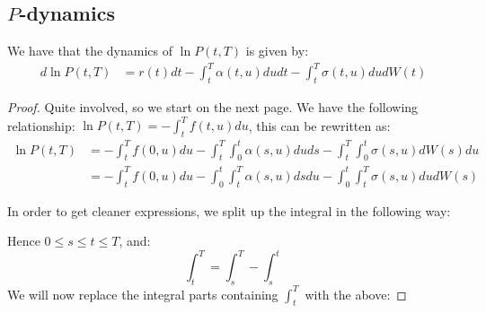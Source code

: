 \subsection{$P$-dynamics}

\begin{proposition}
We have that the dynamics of $\ln P(t,T)$ is given by: 
\begin{align*}
d\ln P(t,T) &= 
r(t)dt - \int_{t}^{T}\alpha(t,u)dudt - \int_{t}^{T}\sigma(t,u)dudW(t)    
\end{align*}
\end{proposition}

\begin{proof}

Quite involved, so we start on the next page. 
\newpage 
We have the following relationship: $\ln P(t,T) = -\int_{t}^{T}f(t,u)du$, this can be rewritten as:
\begin{align*}
\ln P(t,T) &= 
-\int_{t}^{T}f(0,u)du - \int_{t}^{T}\int_{0}^{t}\alpha(s,u)duds 
-\int_{t}^{T}\int_{0}^{t}\sigma(s,u)dW(s)du \\ 
&= 
-\int_{t}^{T}f(0,u)du - \int_{0}^{t}\int_{t}^{T}\alpha(s,u)dsdu 
-\int_{0}^{t}\int_{t}^{T}\sigma(s,u)dudW(s) 
\end{align*}

In order to get cleaner expressions, we split up the integral in the following way:



Hence $0 \leq s \leq t \leq T$, and: 
$$
\int_{t}^{T} = \int_{s}^{T}-\int_{s}^{t}
$$
We will now replace the integral parts containing $\int_{t}^{T}$ with the above: 


\end{proof}
